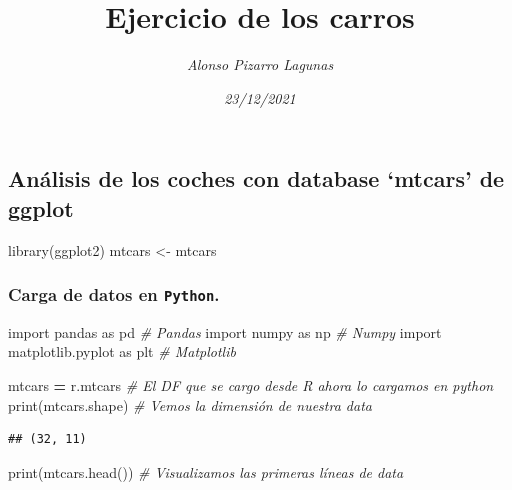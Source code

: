 \documentclass[
]{article}
\title{Ejercicio de los carros}
\author{\emph{Alonso Pizarro Lagunas}}
\date{\emph{23/12/2021}}
\newenvironment{Shaded}{\begin{snugshade}}{\end{snugshade}}
\newcommand{\BuiltInTok}[1]{#1}
\newcommand{\CommentTok}[1]{\textcolor[rgb]{0.56,0.35,0.01}{\textit{#1}}}
\newcommand{\FunctionTok}[1]{\textcolor[rgb]{0.00,0.00,0.00}{#1}}
\newcommand{\ImportTok}[1]{#1}
\newcommand{\NormalTok}[1]{#1}
\newcommand{\OperatorTok}[1]{\textcolor[rgb]{0.81,0.36,0.00}{\textbf{#1}}}
\newcommand{\OtherTok}[1]{\textcolor[rgb]{0.56,0.35,0.01}{#1}}
\begin{document}
\maketitle

\hypertarget{anuxe1lisis-de-los-coches-con-database-mtcars-de-ggplot}{%
\subsection{Análisis de los coches con database `mtcars' de
ggplot}\label{anuxe1lisis-de-los-coches-con-database-mtcars-de-ggplot}}

\begin{Shaded}
\begin{Highlighting}[]
\FunctionTok{library}\NormalTok{(ggplot2)}
\NormalTok{mtcars }\OtherTok{\textless{}{-}}\NormalTok{  mtcars}
\end{Highlighting}
\end{Shaded}

\hypertarget{carga-de-datos-en-python.}{%
\subsubsection{\texorpdfstring{Carga de datos en
\texttt{Python}.}{Carga de datos en Python.}}\label{carga-de-datos-en-python.}}

\begin{Shaded}
\begin{Highlighting}[]
\ImportTok{import}\NormalTok{ pandas }\ImportTok{as}\NormalTok{ pd     }\CommentTok{\# Pandas}
\ImportTok{import}\NormalTok{ numpy  }\ImportTok{as}\NormalTok{ np     }\CommentTok{\# Numpy }
\ImportTok{import}\NormalTok{ matplotlib.pyplot }\ImportTok{as}\NormalTok{ plt  }\CommentTok{\# Matplotlib }


\NormalTok{mtcars }\OperatorTok{=}\NormalTok{ r.mtcars       }\CommentTok{\# El DF que se cargo desde R ahora lo cargamos en python }
\BuiltInTok{print}\NormalTok{(mtcars.shape)     }\CommentTok{\# Vemos la dimensión de nuestra data }
\end{Highlighting}
\end{Shaded}

\begin{verbatim}
## (32, 11)
\end{verbatim}

\begin{Shaded}
\begin{Highlighting}[]
\BuiltInTok{print}\NormalTok{(mtcars.head())    }\CommentTok{\# Visualizamos las primeras líneas de data}
\end{Highlighting}
\end{Shaded}
\end{document}
